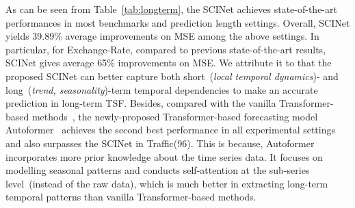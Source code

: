 \documentclass{article}
\begin{document}
As can be seen from Table~\ref{tab:longterm}, the SCINet achieves state-of-the-art performances in most benchmarks and prediction length settings. Overall, SCINet yields 39.89$\%$ average improvements on MSE among the above settings. In particular, for Exchange-Rate, compared to previous state-of-the-art results, SCINet gives average 65$\%$ improvements on MSE. We attribute it to that the proposed SCINet can better capture both short~(\emph{local temporal dynamics})- and long~(\emph{trend, seasonality})-term temporal dependencies to make an accurate prediction in long-term TSF. Besides, compared with the vanilla Transformer-based methods~\citep{kitaev2019reformer,li2019enhancing,Zhou2020InformerBE}, the newly-proposed Transformer-based forecasting model Autoformer~\citep{Wu2021AutoformerDT} achieves the second best performance in all experimental settings and also surpasses the SCINet in Traffic(96). This is because, Autoformer incorporates more prior knowledge about the time series data. It focuses on modelling seasonal patterns and conducts self-attention at the sub-series level~(instead of the raw data), which is much better in extracting long-term temporal patterns than vanilla Transformer-based methods.
\end{document}
